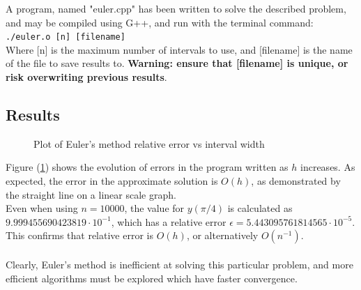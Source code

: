 \documentclass[pdf,color]{UoBnote}
\begin{document}
	A program, named "euler.cpp" has been written to solve the described problem, and may be compiled using G++, and run with the terminal command:\\
	\texttt{./euler.o [n] [filename]}\\
	Where [n] is the maximum number of intervals to use, and [filename] is the name of the file to save results to. \textbf{Warning: ensure that [filename] is unique, or risk overwriting previous results}. 
				
	\subsection{Results}
				
				
				\begin{figure}[H]
					\centering
					\caption{Plot of Euler's method relative error vs interval width}
					\label{fig:eu-e-vs-h-1}
				\end{figure}
	Figure (\ref{fig:eu-e-vs-h-1}) shows the evolution of errors in the program written as $h$ increases. As expected, the error in the approximate solution is $O(h)$, as demonstrated by the straight line on a linear scale graph.\\
	Even when using $n=10000$, the value for $y(\pi/4)$ is calculated as $9.999455690423819\cdot10^{-1}$, which has a relative error $\epsilon = 5.443095761814565\cdot10^{-5}$. This confirms that relative error is $O(h)$, or alternatively $O(n^{-1})$.\\\\
	Clearly, Euler's method is inefficient at solving this particular problem, and more efficient algorithms must be explored which have faster convergence.
		
\end{document}
